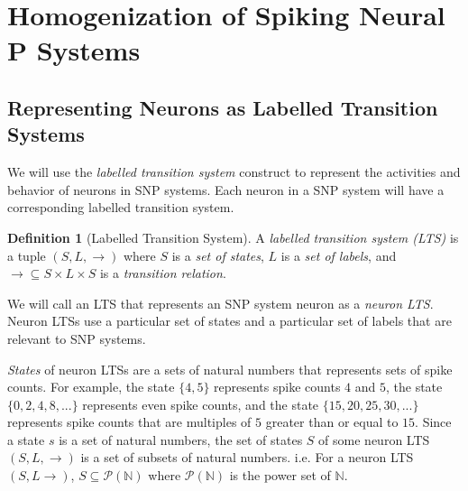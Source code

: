 \documentclass[runningheads,a4paper]{llncs}
\theoremstyle{definition}
\newtheorem{definition2}{Definition}
\newcommand{\ra}{\rightarrow}
\begin{document}
\section{Homogenization of Spiking Neural P Systems} \label{sec-homo}


\subsection{Representing Neurons as Labelled Transition Systems}

We will use the \emph{labelled transition system} construct to represent the activities and behavior 
of neurons in SNP systems. Each neuron in a SNP system will have a corresponding labelled transition 
system.

\begin{definition2}   [Labelled Transition System]   \label{def-lts}
A \emph{labelled transition system (LTS)} is a tuple $(S, L, \ra)$ where $S$ is a \emph{set of 
states}, $L$ is a \emph{set of labels}, and $\ra \subseteq S \times L \times S$ is a 
\emph{transition relation}.
\end{definition2}

We will call an LTS that represents an SNP system neuron as a \emph{neuron LTS}. Neuron LTSs use a 
particular set of states and a particular set of labels that are relevant to SNP systems.


\emph{States} of neuron LTSs are a sets of natural numbers that represents sets of spike counts. 
For example, the state $\{4,5\}$ represents spike counts $4$ and $5$, the state $\{0,2,4,8,...\}$ 
represents even spike counts, and the state $\{15,20,25,30,...\}$ represents spike counts that 
are multiples of $5$ greater than or equal to $15$. Since a state $s$ is a set of natural numbers,
the set of states $S$ of some neuron LTS $(S,L,\ra)$ is a set of subsets of natural numbers. i.e.
For a neuron LTS $(S,L\ra)$, $S \subseteq \mathcal{P}(\mathbb{N})$ where $\mathcal{P}(\mathbb{N})$ 
is the power set of $\mathbb{N}$.

\end{document}
